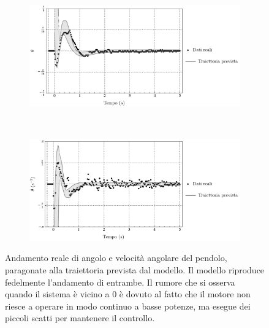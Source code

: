 \begin{figure}
    \centering
    \begin{subfigure}[]{\textwidth}
        \centering
        \includegraphics[width=\textwidth]{assets/a-plot}
    \end{subfigure}
    \\[5ex]
    \begin{subfigure}[]{\textwidth}
        \centering
        \includegraphics[width=\textwidth]{assets/w-plot}
    \end{subfigure}

    \caption[Resistenza alle perturbazioni: angolo e velocità angolare]{
        Andamento reale di angolo e velocità angolare del pendolo,
        paragonate alla traiettoria prevista dal modello.
        Il modello riproduce fedelmente l'andamento di entrambe.
        Il rumore che si osserva quando il sistema è vicino a $0$
        è dovuto al fatto che il motore non riesce a operare in modo
        continuo a basse potenze, ma esegue dei piccoli
        scatti per mantenere il controllo.
    }
    \label{fig:swag2}
\end{figure}